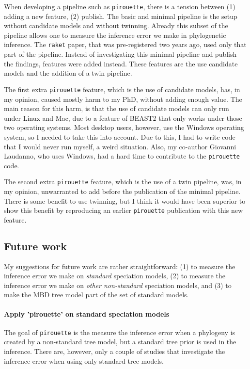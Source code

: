 When developing a pipeline such as \verb;pirouette;, there is a tension
between (1) adding a new feature, (2) publish. The basic
and minimal pipeline is the setup without candidate models and without
twinning. Already this subset of the pipeline allows one to 
measure the inference error we make in phylogenetic inference.
The \verb;raket; paper, that was pre-registered two years ago, used only
that part of the pipeline. Instead of investigating this minimal
pipeline and publish the findings, features were added instead.
These features are the use candidate models and the addition
of a twin pipeline. 

The first extra \verb;pirouette; feature, which is the use of candidate models,
has, in my opinion, caused mostly harm to my PhD, without adding
enough value. The main reason for this harm, is that the use of candidate
models can only run under Linux and Mac, due to a feature of BEAST2 that
only works under those two operating systems. Most desktop users, however,
use the Windows operating system, so I needed to take this into account.
Due to this, I had to write code that I would never run myself, a weird
situation. Also, my co-author Giovanni Laudanno, who uses Windows, had
a hard time to contribute to the \verb;pirouette; code. 

The second extra \verb;pirouette; feature, which is the use of a twin pipeline,
was, in my opinion, unwarranted to add before the publication of the minimal
pipeline. There is some benefit to use twinning, but I think 
it would have been superior to show this benefit by reproducing an earlier
\verb;pirouette; publication with this new feature.

\subsection{Future work}

My suggestions for future work are rather straightforward:
(1) to measure the inference error we make on \emph{standard}
speciation models, (2) to measure the inference error we make 
on \emph{other non-standard} speciation models, and (3) to
make the MBD tree model part of the set of standard models.

\paragraph{Apply 'pirouette' on standard speciation models} 

The goal of \verb;pirouette; is the measure the inference error
when a phylogeny is created by a non-standard tree model,
but a standard tree prior is used in the inference. There are,
however, only a couple of studies that investigate the
inference error when using only standard tree models.

